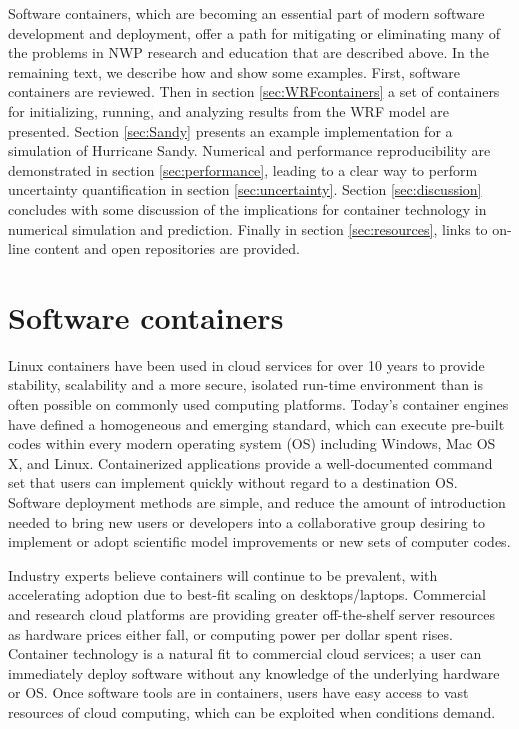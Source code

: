 \documentclass[final]{ametsoc}
\begin{document}
Software containers, which are becoming an essential part of modern software development and deployment, offer a path for mitigating or eliminating many of the problems in NWP research and education that are described above.  In the remaining text, we describe how and show some examples. First, software containers are reviewed. Then in section \ref{sec:WRFcontainers} a set of containers for initializing, running, and analyzing results from the WRF model are presented.  Section \ref{sec:Sandy} presents an example implementation for a simulation of Hurricane Sandy. Numerical and performance reproducibility are demonstrated in section \ref{sec:performance}, leading to a clear way to perform uncertainty quantification in section \ref{sec:uncertainty}. Section \ref{sec:discussion} concludes with some discussion of the implications for container technology in numerical simulation and prediction. Finally in section \ref{sec:resources}, links to on-line content and open repositories are provided.

\section{Software containers}\label{sec:containers}

Linux containers  have been used in cloud services for over 10 years to provide stability, scalability and a more secure, isolated run-time environment than is often possible on commonly used computing platforms. Today's container engines have defined a homogeneous and emerging standard, which can execute pre-built codes within every modern operating system (OS) including Windows, Mac OS X, and Linux.  Containerized applications provide a well-documented command set that users can implement quickly without regard to a destination OS.  Software deployment methods are simple, and reduce the amount of introduction needed to bring new users or developers into a collaborative group desiring to implement or adopt scientific model improvements or new sets of computer codes.  

Industry experts believe containers will continue to be prevalent, with accelerating adoption due to best-fit scaling on desktops/laptops. Commercial and research cloud platforms are providing greater off-the-shelf server resources as hardware prices either fall, or computing power per dollar spent rises. Container technology is a natural fit to commercial cloud services; a user can immediately deploy software without any knowledge of the underlying hardware or OS. Once software tools are in containers, users have easy access to vast resources of cloud computing, which can be exploited when conditions demand.
\end{document}
